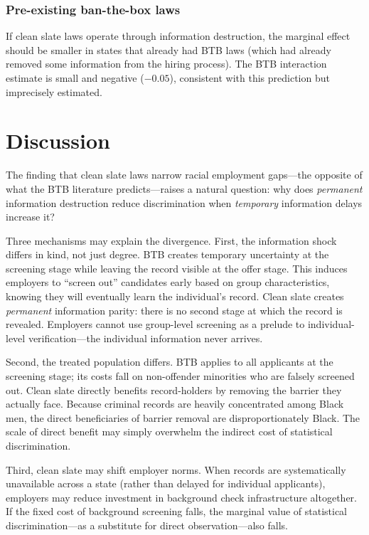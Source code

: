 \documentclass[12pt]{article}
\begin{document}
\subsubsection*{Pre-existing ban-the-box laws} If clean slate laws operate through information destruction, the marginal effect should be smaller in states that already had BTB laws (which had already removed some information from the hiring process). The BTB interaction estimate is small and negative ($-0.05$), consistent with this prediction but imprecisely estimated.

\section{Discussion}

The finding that clean slate laws narrow racial employment gaps---the opposite of what the BTB literature predicts---raises a natural question: why does \emph{permanent} information destruction reduce discrimination when \emph{temporary} information delays increase it?

Three mechanisms may explain the divergence. First, the information shock differs in kind, not just degree. BTB creates temporary uncertainty at the screening stage while leaving the record visible at the offer stage. This induces employers to ``screen out'' candidates early based on group characteristics, knowing they will eventually learn the individual's record. Clean slate creates \emph{permanent} information parity: there is no second stage at which the record is revealed. Employers cannot use group-level screening as a prelude to individual-level verification---the individual information never arrives.

Second, the treated population differs. BTB applies to all applicants at the screening stage; its costs fall on non-offender minorities who are falsely screened out. Clean slate directly benefits record-holders by removing the barrier they actually face. Because criminal records are heavily concentrated among Black men, the direct beneficiaries of barrier removal are disproportionately Black. The scale of direct benefit may simply overwhelm the indirect cost of statistical discrimination.

Third, clean slate may shift employer norms. When records are systematically unavailable across a state (rather than delayed for individual applicants), employers may reduce investment in background check infrastructure altogether. If the fixed cost of background screening falls, the marginal value of statistical discrimination---as a substitute for direct observation---also falls.
\end{document}
